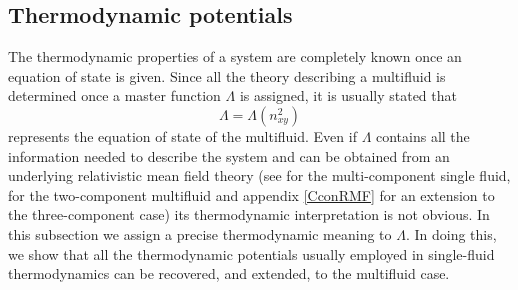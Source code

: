 \documentclass[usenatbib]{mnras}
\begin{document}
\subsection{Thermodynamic potentials}
\label{thermopetentissimi}

The thermodynamic properties of a system are completely known once an equation of state is given. Since all the theory describing a multifluid is determined once a master function $\Lambda$ is assigned, it is usually stated that 
%
\begin{equation}
\Lambda = \Lambda (n_{xy}^2)
\end{equation}
%
represents the equation of state of the multifluid. Even if $\Lambda$ contains all the information needed to describe the system and can be obtained from an underlying relativistic mean field theory (see \cite{glendenning_book} for the multi-component single fluid, \cite{comerRMF} for the two-component multifluid and appendix \ref{CconRMF} for an extension to the three-component case) its thermodynamic interpretation is not obvious. In this subsection we assign a precise thermodynamic meaning to $\Lambda$. In doing this, we show that all the thermodynamic potentials usually employed in single-fluid thermodynamics can be recovered, and extended, to the multifluid case. 
\end{document}
